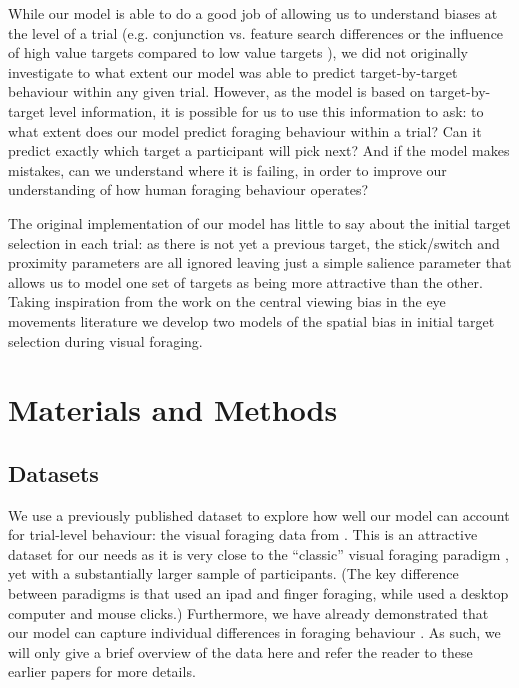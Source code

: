 \documentclass[preprints, article,submit,pdftex,moreauthors]{Definitions/mdpi}
\begin{document}
While our model is able to do a good job of allowing us to understand biases at the level of a trial (e.g. conjunction vs. feature search differences \cite{kristjansson2014} or the influence of high value targets compared to low value targets \cite{tagu2020}), we did not originally investigate to what extent our model was able to predict target-by-target behaviour within any given trial. However, as the model is based on target-by-target level information, it is possible for us to use this information to ask: to what extent does our model predict foraging behaviour within a trial? Can it predict exactly which target a participant will pick next? And if the model makes mistakes, can we understand where it is failing, in order to improve our understanding of how human foraging behaviour operates?

The original implementation of our model has little to say about the initial target selection in each trial: as there is not yet a previous target, the stick/switch and proximity parameters are all ignored leaving just a simple salience parameter that allows us to model one set of targets as being more attractive than the other. Taking inspiration from the work on the central viewing bias in the eye movements literature \cite{clarke2014deriving, clarke2017} we develop two models of the spatial bias in initial target selection during visual foraging.  

\section{Materials and Methods}

\subsection{Datasets}

We use a previously published dataset to explore how well our model can account for trial-level behaviour: the visual foraging data from \cite{clarke2022}. This is an attractive dataset for our needs as it is very close to the ``classic'' visual foraging paradigm \citep{kristjansson2014}, yet with a substantially larger sample of participants. (The key difference between paradigms is that \cite{kristjansson2014} used an ipad and finger foraging, while \cite{clarke2022} used a desktop computer and mouse clicks.) Furthermore, we have already demonstrated that our model can capture individual differences in foraging behaviour \citep{clarke2022}. As such, we will only give a brief overview of the data here and refer the reader to these earlier papers for more details.
\end{document}
